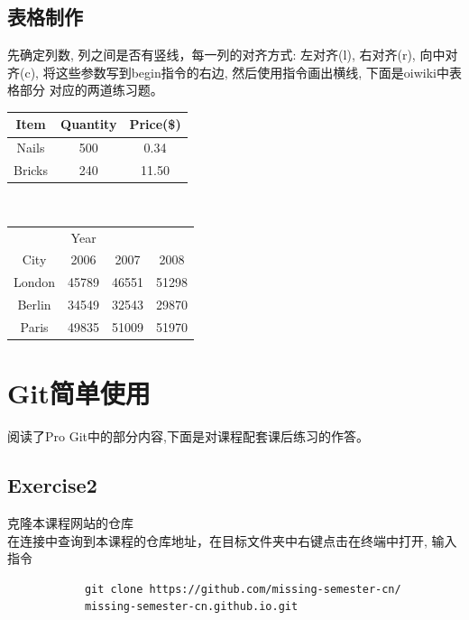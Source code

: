 \documentclass{article}
\begin{document}
        \subsection{表格制作}
            先确定列数, 列之间是否有竖线，每一列的对齐方式: 左对齐(l), 右对齐(r), 向中对齐(c), 
            将这些参数写到begin指令的右边, 然后使用指令画出横线, 下面是oiwiki中表格部分
            对应的两道练习题。\\
            \begin{tabular}{|c|c|c|}
            \hline
            Item   & Quantity & Price(\$) \\
            \hline
            Nails  & 500      & 0.34\\
            Bricks & 240      & 11.50\\
            \hline
            \end{tabular}

            \hspace*{\fill} \\
            \begin{tabular}{c|ccc}
            & Year & & \\
            \cline{2-4}
            City & 2006 & 2007 & 2008\\
            \hline
            London & 45789 & 46551 & 51298\\
            Berlin & 34549 & 32543 & 29870\\
            Paris  & 49835 & 51009 & 51970\\

            \end{tabular}
        \newpage
    
    \sloppy
    \section{Git简单使用}
    阅读了Pro Git中的部分内容,下面是对课程配套课后练习的作答。
        \subsection{Exercise2}
            克隆本课程网站的仓库\\
            在连接中查询到本课程的仓库地址，在目标文件夹中右键点击在终端中打开, 输入指令
            \begin{verbatim}
            git clone https://github.com/missing-semester-cn/
            missing-semester-cn.github.io.git
            \end{verbatim}
                
\end{document}

